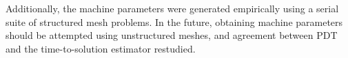 Additionally, the machine parameters were generated empirically using a serial suite of structured mesh problems.
In the future, obtaining machine parameters should be attempted using unstructured meshes, and agreement between PDT and the time-to-solution estimator restudied.

%
%
